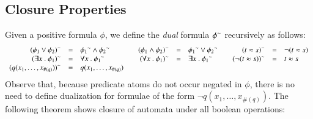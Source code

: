 \documentclass{llncs}
\begin{document}
\subsection{Closure Properties}
\label{sec:closure}

Given a positive formula $\phi$, we define the \emph{dual} formula
${\phi}^{\sim}$ recursively as follows:
\[\begin{array}{rclcrclcrcl}
{(\phi_1 \vee \phi_2)}^{\sim} & = & {\phi_1}^{\sim} \wedge {\phi_2}^{\sim} && 
{(\phi_1 \wedge \phi_2)}^{\sim} & = & {\phi_1}^{\sim} \vee {\phi_2}^{\sim} &&
{(t \approx s)}^{\sim} & = & \neg(t \approx s) \\
{(\exists x ~.~ \phi_1)}^{\sim} & = & \forall x ~.~ {\phi_1}^{\sim} && 
{(\forall x ~.~ \phi_1)}^{\sim} & = & \exists x ~.~ {\phi_1}^{\sim} && 
{(\neg(t \approx s))}^{\sim} & = & t \approx s \\
{(q(x_1,\ldots,x_{\#(q)}))}^{\sim} & = & q(x_1,\ldots,x_{\#(q)})
\end{array}\]
Observe that, because predicate atoms do not occur negated in $\phi$,
there is no need to define dualization for formulae of the form $\neg
q(x_1,\ldots,x_{\#(q)})$. The following theorem shows closure of
automata under all boolean operations:

\end{document}
